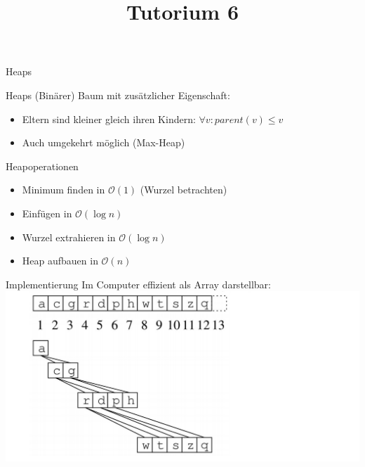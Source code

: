 
\title[Algorithmen I SS 14]{Tutorium 6}

\usepackage{alltt}





\begin{frame}
  \maketitle
\end{frame}

\begin{frame}
	\begin{center}
		\Huge
		Heaps
	\end{center}
\end{frame}

\begin{frame}{Heaps}
	(Binärer) Baum mit zusätzlicher Eigenschaft:
	\begin{itemize}
		\item Eltern sind kleiner gleich ihren Kindern: $\forall v: parent(v) \leq v$
		\item Auch umgekehrt möglich (Max-Heap)
	\end{itemize}

\end{frame}

\begin{frame}{Heapoperationen}
	\begin{itemize}
		\item Minimum finden in $\mathcal{O}(1)$ (Wurzel betrachten)
		\item Einfügen in $\mathcal{O}(\log{n})$
		\item Wurzel extrahieren in $\mathcal{O}(\log{n})$
		\item Heap aufbauen in $\mathcal{O}(n)$
	\end{itemize}

\end{frame}

\begin{frame}{Implementierung}
	Im Computer effizient als Array darstellbar: \\
	\includegraphics[scale=0.2]{images/heapArray.png} \\
\end{frame}

